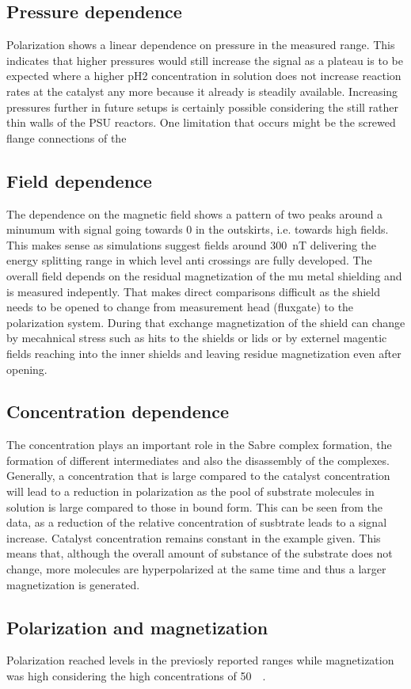         \subsection{Pressure dependence}
            Polarization shows a linear dependence on pressure in the measured range. This indicates that higher pressures would still increase the signal as a plateau is to be expected where a higher pH2 concentration in solution does not increase reaction rates at the catalyst any more because it already is steadily available. Increasing pressures further in future setups is certainly possible considering the still rather thin walls of the PSU reactors. One limitation that occurs might be the screwed flange connections of the 
        \subsection{Field dependence}
            The dependence on the magnetic field shows a pattern of two peaks around a minumum with signal going towards 0 in the outskirts, i.e. towards high fields. This makes sense as simulations suggest fields around \SI{300}{\nano\tesla} delivering the energy splitting range in which level anti crossings are fully developed. The overall field depends on the residual magnetization of the mu metal shielding and is measured indepently. That makes direct comparisons difficult as the shield needs to be opened to change from measurement head (fluxgate) to the polarization system. During that exchange magnetization of the shield can change by mecahnical stress such as hits to the shields or lids or by externel magentic fields reaching into the inner shields and leaving residue magnetization even after opening.
        \subsection{Concentration dependence}
            The concentration plays an important role in the Sabre complex formation, the formation of different intermediates and also the disassembly of the complexes. Generally, a concentration that is large compared to the catalyst concentration will lead to a reduction in polarization as the pool of substrate molecules in solution is large compared to those in bound form. This can be seen from the data, as a reduction of the relative concentration of susbtrate leads to a signal increase. Catalyst concentration remains constant in the example given. This means that, although the overall amount of substance of the substrate does not change, more molecules are hyperpolarized at the same time and thus a larger magnetization is generated.
        \subsection{Polarization and magnetization}
            Polarization reached levels in the previosly reported ranges while magnetization was high considering the high concentrations of \SI{50}{\milli\molar}. 
